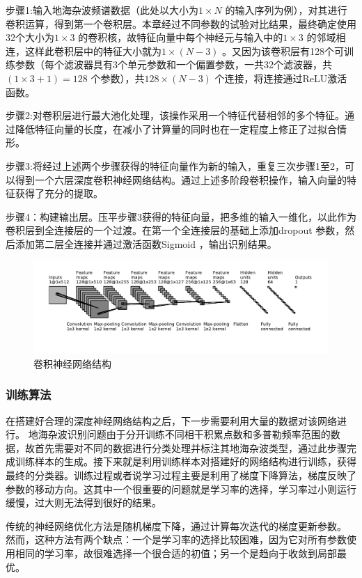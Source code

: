 步骤1:输入地海杂波频谱数据（此处以大小为$1\times N$ 的输入序列为例），对其进行卷积运算，得到第一个卷积层。本章经过不同参数的试验对比结果，最终确定使用32个大小为$1\times 3$ 的卷积核，故特征向量中每个神经元与输入中的$1\times 3$ 的邻域相连，这样此卷积层中的特征大小就为$1\times (N-3)$ 。又因为该卷积层有128个可训练参数（每个滤波器具有3个单元参数和一个偏置参数，一共32个滤波器，共$(1\times 3 + 1) = 128$ 个参数），共$128\times(N-3)$ 个连接，将连接通过ReLU激活函数。

步骤2:对卷积层进行最大池化处理，该操作采用一个特征代替相邻的多个特征。通过降低特征向量的长度，在减小了计算量的同时也在一定程度上修正了过拟合情形。

步骤3:将经过上述两个步骤获得的特征向量作为新的输入，重复三次步骤1至2，可以得到一个六层深度卷积神经网络结构。通过上述多阶段卷积操作，输入向量的特征获得了充分的提取。

步骤4：构建输出层。压平步骤3获得的特征向量，把多维的输入一维化，以此作为卷积层到全连接层的一个过渡。在第一个全连接层的基础上添加dropout 参数，然后添加第二层全连接并通过激活函数Sigmoid ，输出识别结果。

\begin{figure}[hbt]
	\centering
	\includegraphics[width=\textwidth]{figures/othr/struct}
	\caption{卷积神经网络结构}
	\label{fig:struct}
\end{figure}

\subsubsection{训练算法}
在搭建好合理的深度神经网络结构之后，下一步需要利用大量的数据对该网络进行。
地海杂波识别问题由于分开训练不同相干积累点数和多普勒频率范围的数据，故首先需要对不同的数据进行分类处理并标注其地海杂波类型，通过此步骤完成训练样本的生成。接下来就是利用训练样本对搭建好的网络结构进行训练，获得最终的分类器。训练过程或者说学习过程主要是利用了梯度下降算法，梯度反映了参数的移动方向。这其中一个很重要的问题就是学习率的选择，学习率过小则运行缓慢，过大则无法得到很好的结果。

传统的神经网络优化方法是随机梯度下降，通过计算每次迭代的梯度更新参数。
然而，这种方法有两个缺点：一个是学习率的选择比较困难，因为它对所有参数使用相同的学习率，故很难选择一个很合适的初值；另一个是趋向于收敛到局部最优。

